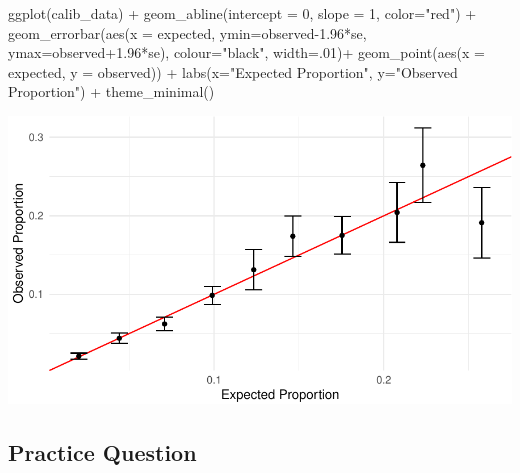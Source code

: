 \documentclass[
  letterpaper,
]{krantz}
\makeatletter
\newenvironment{Shaded}{\begin{snugshade}}{\end{snugshade}}
\newcommand{\AttributeTok}[1]{\textcolor[rgb]{0.40,0.45,0.13}{#1}}
\newcommand{\DecValTok}[1]{\textcolor[rgb]{0.68,0.00,0.00}{#1}}
\newcommand{\FloatTok}[1]{\textcolor[rgb]{0.68,0.00,0.00}{#1}}
\newcommand{\FunctionTok}[1]{\textcolor[rgb]{0.28,0.35,0.67}{#1}}
\newcommand{\NormalTok}[1]{\textcolor[rgb]{0.00,0.23,0.31}{#1}}
\newcommand{\SpecialCharTok}[1]{\textcolor[rgb]{0.37,0.37,0.37}{#1}}
\newcommand{\StringTok}[1]{\textcolor[rgb]{0.13,0.47,0.30}{#1}}
\newenvironment{kframe}{%
\medskip{}
\setlength{\fboxsep}{.8em}
 \def\at@end@of@kframe{}%
 \ifinner\ifhmode%
  \def\at@end@of@kframe{\end{minipage}}%
  \begin{minipage}{\columnwidth}%
 \fi\fi%
 \def\FrameCommand##1{\hskip\@totalleftmargin \hskip-\fboxsep
 \colorbox{shadecolor}{##1}\hskip-\fboxsep
     \hskip-\linewidth \hskip-\@totalleftmargin \hskip\columnwidth}%
 \MakeFramed {\advance\hsize-\width
   \@totalleftmargin\z@ \linewidth\hsize
   \@setminipage}}%
 {\par\unskip\endMakeFramed%
 \at@end@of@kframe}
\renewenvironment{Shaded}{\begin{kframe}}{\end{kframe}}
\makeatother
\begin{document}
\begin{Shaded}
\begin{Highlighting}[]
\FunctionTok{ggplot}\NormalTok{(calib\_data) }\SpecialCharTok{+} 
  \FunctionTok{geom\_abline}\NormalTok{(}\AttributeTok{intercept =} \DecValTok{0}\NormalTok{, }\AttributeTok{slope =} \DecValTok{1}\NormalTok{, }\AttributeTok{color=}\StringTok{"red"}\NormalTok{) }\SpecialCharTok{+} 
  \FunctionTok{geom\_errorbar}\NormalTok{(}\FunctionTok{aes}\NormalTok{(}\AttributeTok{x =}\NormalTok{ expected, }\AttributeTok{ymin=}\NormalTok{observed}\FloatTok{{-}1.96}\SpecialCharTok{*}\NormalTok{se, }
                    \AttributeTok{ymax=}\NormalTok{observed}\FloatTok{+1.96}\SpecialCharTok{*}\NormalTok{se), }
                \AttributeTok{colour=}\StringTok{"black"}\NormalTok{, }\AttributeTok{width=}\NormalTok{.}\DecValTok{01}\NormalTok{)}\SpecialCharTok{+}
  \FunctionTok{geom\_point}\NormalTok{(}\FunctionTok{aes}\NormalTok{(}\AttributeTok{x =}\NormalTok{ expected, }\AttributeTok{y =}\NormalTok{ observed)) }\SpecialCharTok{+}
  \FunctionTok{labs}\NormalTok{(}\AttributeTok{x=}\StringTok{"Expected Proportion"}\NormalTok{, }\AttributeTok{y=}\StringTok{"Observed Proportion"}\NormalTok{) }\SpecialCharTok{+}
  \FunctionTok{theme\_minimal}\NormalTok{()}
\end{Highlighting}
\end{Shaded}

\begin{center}
\includegraphics[width=1\textwidth,height=\textheight]{book/logistic_regression_files/figure-pdf/unnamed-chunk-17-1.pdf}
\end{center}

\subsection{Practice Question}\label{practice-question-24}
\end{document}
